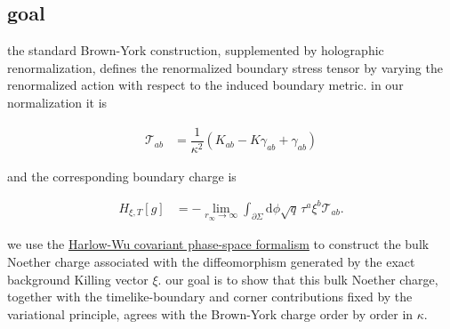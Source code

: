 \subsection{goal}\label{subsec:goal}

the standard Brown-York construction, supplemented by holographic renormalization, defines the renormalized boundary stress tensor by varying the renormalized action with respect to the induced boundary metric. in our normalization it is

\begin{align}
\mathcal{T}_{ab} & =\dfrac{1}{\kappa ^{2}}\left(K_{ab}-K\gamma _{ab}+\gamma _{ab}\right)
\end{align}

and the corresponding boundary charge is

\begin{align}
H_{\xi,T}[g] & =-\lim _{r_{\infty}\to\infty}\int _{\partial\Sigma}\mathrm{d}\phi\sqrt{q}\,\tau ^{a}\xi ^{b}\mathcal{T}_{ab}.
\end{align}

we use the \href{https://arxiv.org/abs/1906.08616}{Harlow-Wu covariant phase-space formalism} to construct the bulk Noether charge associated with the diffeomorphism generated by the exact background Killing vector $\displaystyle{\xi}$. our goal is to show that this bulk Noether charge, together with the timelike-boundary and corner contributions fixed by the variational principle, agrees with the Brown-York charge order by order in $\displaystyle{\kappa}$.
